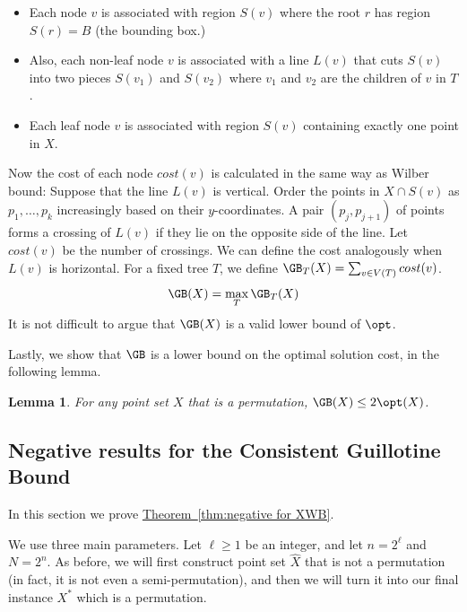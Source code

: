 \documentclass[11pt]{article}
\numberwithin{equation}{section}
\newtheorem{lemma}[theorem]{Lemma}
\theoremstyle{definition}
\theoremstyle{plain}
\newcommand{\expref}[2]{\hyperref[#2]{#1~\ref{#2}}}
\begin{document}
\begin{itemize}
\item Each node $v$ is associated with region $S(v)$ where the root $r$ has region $S(r) = B$ (the bounding box.) 

\item Also, each non-leaf node $v$ is associated with a line $L(v)$ that cuts $S(v)$ into two pieces $S(v_1)$ and $S(v_2)$ where $v_1$ and $v_2$ are the children of $v$ in $T$.

\item Each leaf node $v$ is associated with region $S(v)$ containing exactly one point in $X$.  
\end{itemize}  

Now the cost of each node $cost(v)$ is calculated in the same way as Wilber bound: Suppose that the line $L(v)$ is vertical. Order the points in $X \cap S(v)$ as $p_1, \ldots, p_k$ increasingly based on their $y$-coordinates. A pair $(p_j, p_{j+1})$ of points forms a crossing of $L(v)$ if they lie on the opposite side of the line.
Let $cost(v)$ be the number of crossings. 
We can define the cost analogously when $L(v)$ is horizontal. 
For a fixed tree $T$, we define $\GB_{T}(X) = \sum_{v \in V(T)} cost(v)$. 
\[ \GB(X) = \max_{T} \GB_{T}(X) \]  
It is not difficult to argue that $\GB(X)$ is a valid lower bound of $\opt$. 
\fi

Lastly, we show that $\GB$ is a lower bound on the optimal solution cost, in the following lemma. 

\begin{lemma}\label{lem: GB is lb for opt}
For any point set $X$ that is a permutation, $\GB(X) \leq 2 \opt(X)$.  
\end{lemma} 


%
%
%


%
%



%
%
%
%
\subsection{Negative results for the Consistent Guillotine Bound}\label{subsec: Instance construction for extended}
%
%
%
%
In this section we prove \expref{Theorem}{thm:negative for XWB}.

\newcommand{\EESBRS}{\mbox{\sf 2D-ES-BRS}}
We use three main parameters. Let $\ell\geq 1$ be an integer, and let $n = 2^{\ell}$ and $N= 2^n$.
As before, we will first construct point set $\hat{X}$ that is not a permutation (in fact, it is not even a semi-permutation), and then we will turn it into our final instance $X^*$ which is a permutation.  
%
\end{document}

